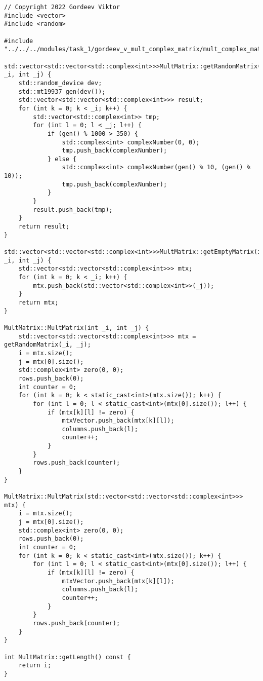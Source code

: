 \documentclass{report}
\begin{document}
\begin{lstlisting}
// Copyright 2022 Gordeev Viktor
#include <vector>
#include <random>

#include "../../../modules/task_1/gordeev_v_mult_complex_matrix/mult_complex_matrix.h"

std::vector<std::vector<std::complex<int>>>MultMatrix::getRandomMatrix(int _i, int _j) {
    std::random_device dev;
    std::mt19937 gen(dev());
    std::vector<std::vector<std::complex<int>>> result;
    for (int k = 0; k < _i; k++) {
        std::vector<std::complex<int>> tmp;
        for (int l = 0; l < _j; l++) {
            if (gen() % 1000 > 350) {
                std::complex<int> complexNumber(0, 0);
                tmp.push_back(complexNumber);
            } else {
                std::complex<int> complexNumber(gen() % 10, (gen() % 10));
                tmp.push_back(complexNumber);
            }
        }
        result.push_back(tmp);
    }
    return result;
}

std::vector<std::vector<std::complex<int>>>MultMatrix::getEmptyMatrix(int _i, int _j) {
    std::vector<std::vector<std::complex<int>>> mtx;
    for (int k = 0; k < _i; k++) {
        mtx.push_back(std::vector<std::complex<int>>(_j));
    }
    return mtx;
}

MultMatrix::MultMatrix(int _i, int _j) {
    std::vector<std::vector<std::complex<int>>> mtx = getRandomMatrix(_i, _j);
    i = mtx.size();
    j = mtx[0].size();
    std::complex<int> zero(0, 0);
    rows.push_back(0);
    int counter = 0;
    for (int k = 0; k < static_cast<int>(mtx.size()); k++) {
        for (int l = 0; l < static_cast<int>(mtx[0].size()); l++) {
            if (mtx[k][l] != zero) {
                mtxVector.push_back(mtx[k][l]);
                columns.push_back(l);
                counter++;
            }
        }
        rows.push_back(counter);
    }
}

MultMatrix::MultMatrix(std::vector<std::vector<std::complex<int>>> mtx) {
    i = mtx.size();
    j = mtx[0].size();
    std::complex<int> zero(0, 0);
    rows.push_back(0);
    int counter = 0;
    for (int k = 0; k < static_cast<int>(mtx.size()); k++) {
        for (int l = 0; l < static_cast<int>(mtx[0].size()); l++) {
            if (mtx[k][l] != zero) {
                mtxVector.push_back(mtx[k][l]);
                columns.push_back(l);
                counter++;
            }
        }
        rows.push_back(counter);
    }
}

int MultMatrix::getLength() const {
    return i;
}


\end{lstlisting}
\end{document}
